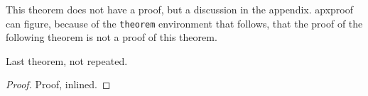 \begin{toappendix}
  This theorem does not have a proof, but a discussion in the appendix.
  \textsf{apxproof} can figure, because of the \verb|theorem| environment
  that follows, that the proof of the following theorem is not a proof of
  this theorem.
\end{toappendix}

\begin{theorem}
  Last theorem, not repeated.
\end{theorem}

\begin{proof}
  Proof, inlined.
\end{proof}





